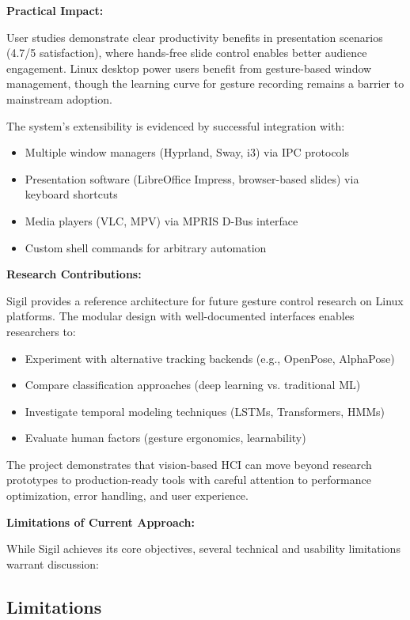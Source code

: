 \documentclass[11pt,a4paper]{article}
\begin{document}
\textbf{Practical Impact:}

User studies demonstrate clear productivity benefits in presentation scenarios (4.7/5 satisfaction), where hands-free slide control enables better audience engagement. Linux desktop power users benefit from gesture-based window management, though the learning curve for gesture recording remains a barrier to mainstream adoption.

The system's extensibility is evidenced by successful integration with:
\begin{itemize}
\item Multiple window managers (Hyprland, Sway, i3) via IPC protocols
\item Presentation software (LibreOffice Impress, browser-based slides) via keyboard shortcuts
\item Media players (VLC, MPV) via MPRIS D-Bus interface
\item Custom shell commands for arbitrary automation
\end{itemize}

\textbf{Research Contributions:}

Sigil provides a reference architecture for future gesture control research on Linux platforms. The modular design with well-documented interfaces enables researchers to:
\begin{itemize}
\item Experiment with alternative tracking backends (e.g., OpenPose, AlphaPose)
\item Compare classification approaches (deep learning vs. traditional ML)
\item Investigate temporal modeling techniques (LSTMs, Transformers, HMMs)
\item Evaluate human factors (gesture ergonomics, learnability)
\end{itemize}

The project demonstrates that vision-based HCI can move beyond research prototypes to production-ready tools with careful attention to performance optimization, error handling, and user experience.

\textbf{Limitations of Current Approach:}

While Sigil achieves its core objectives, several technical and usability limitations warrant discussion:

\subsection{Limitations}
\end{document}
